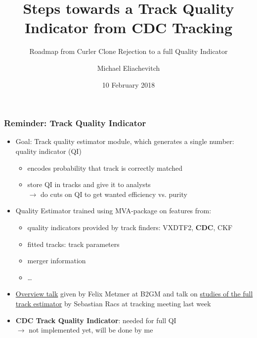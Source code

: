 \documentclass[18pt]{beamer}
\title{Steps towards a Track Quality Indicator from CDC Tracking}
\subtitle{Roadmap from Curler Clone Rejection to a full Quality Indicator}
\author{Michael Eliachevitch}
\date{10 February 2018}
\institute{ETP - KIT}
\begin{document}

\begin{frame}
  \titlepage
\end{frame}

\begin{frame}
  \frametitle{Reminder: Track Quality Indicator}
  \begin{itemize}
  \item Goal: Track quality estimator module, which generates a single number: quality indicator (QI)
    \begin{itemize}
    \item encodes probability that track is correctly matched
    \item store QI in tracks and give it to analysts\\
      $\rightarrow$ do cuts on QI to get wanted efficiency vs. purity
    \end{itemize}
  \item Quality Estimator trained using MVA-package on features from:
    \begin{itemize}
    \item quality indicators provided by track finders: VXDTF2, \textbf{CDC}, CKF
    \item fitted tracks: track parameters
    \item merger information
    \item \dots
    \end{itemize}
  \item  \href{https://kds.kek.jp/indico/event/26522/session/10/contribution/75/material/slides/0.pdf}{Overview talk} given by Felix Metzner at B2GM and talk on \href{https://indico.desy.de/indico/event/19869/contribution/14/material/slides/0.pdf}{studies of the full track estimator} by Sebastian Racs at tracking meeting last week
  \item \textbf{CDC Track Quality Indicator}: needed for full QI\\
    $\rightarrow$ not implemented yet, will be done by me
  \end{itemize}
\end{frame}
\end{document}
